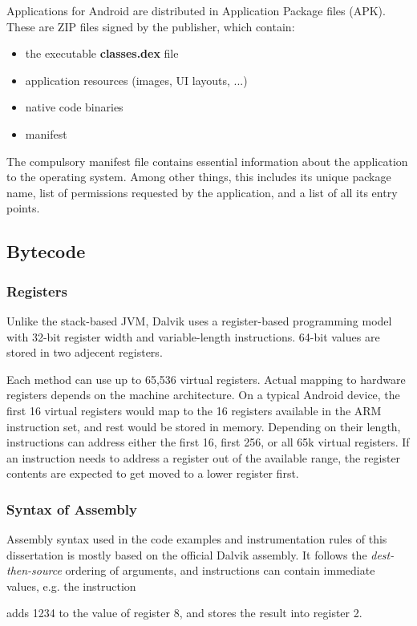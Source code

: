 \documentclass[12pt,twoside,notitlepage]{report}
\newcommand{\centerbox}[1] {
	\begin{center}
		\minibox{#1}
	\end{center}
}
\newcommand{\asm}[1] {\small{\textsf{#1}}}
\begin{document}
Applications for Android are distributed in Application Package files (APK). These are ZIP files signed by the publisher, which contain:
\begin{itemize}
\item the executable \textbf{classes.dex} file
\item application resources (images, UI layouts, ...)
\item native code binaries
\item manifest
\end{itemize}

The compulsory manifest file contains essential information about the application to the operating system. Among other things, this includes its unique package name, list of permissions requested by the application, and a list of all its entry points.

\subsection{Bytecode}

\subsubsection{Registers}

Unlike the stack-based JVM, Dalvik uses a register-based programming model with 32-bit register width and variable-length instructions. 64-bit values are stored in two adjecent registers.

Each method can use up to 65,536 virtual registers. Actual mapping to hardware registers depends on the machine architecture. On a typical Android device, the first 16 virtual registers would map to the 16 registers available in the ARM instruction set, and rest would be stored in memory. Depending on their length, instructions can address either the first 16, first 256, or all 65k virtual registers. If an instruction needs to address a register out of the available range, the register contents are expected to get moved to a lower register first.

\subsubsection{Syntax of Assembly}
Assembly syntax used in the code examples and instrumentation rules of this dissertation is mostly based on the official Dalvik assembly. It follows the \emph{dest-then-source} ordering of arguments, and instructions can contain immediate values, e.g. the instruction
\centerbox{
	\asm{add-int/lit16 v2, v8, \#1234}
}
adds 1234 to the value of register 8, and stores the result into register 2. 
\end{document}
